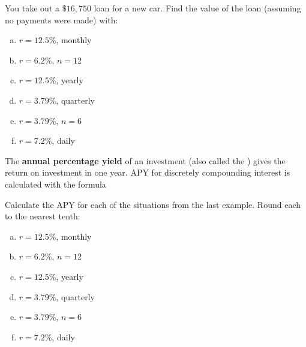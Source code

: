 \documentclass[notes]{subfiles}
\begin{document}
		\begin{ex}
			You take out a $\$16,750$ loan for a new car.  Find the value of the loan (assuming no payments were made) with:
			\begin{enumerate}[(a)]
				\item $r = 12.5\%$, monthly
				\item $r = 6.2\%$, $n = 12$
				\item $r = 12.5\%$, yearly
				\item $r = 3.79\%$, quarterly
					\newpage
					
				\item $r = 3.79\%$, $n = 6$
				\item $r = 7.2\%$, daily
			\end{enumerate}
		\end{ex}

		\begin{defn}
			The \textbf{annual percentage yield} of an investment (also called the ) gives the return on investment in one year.  APY for discretely compounding interest is calculated with the formula
				\fitb{\[APY_{\text{D}} = \left[\lrpar{1+\dfrac{r}{n}}^{n}-1\right]\cdot 100\%\]}{\vspace{1in}}
		\end{defn}

		\begin{ex}
			Calculate the APY for each of the situations from the last example.  Round each to the nearest tenth:
			\begin{enumerate}[(a)]
				\item $r = 12.5\%$, monthly
					\vs{1}

				\item $r = 6.2\%$, $n = 12$
					\vs{1}

				\item $r = 12.5\%$, yearly
					\vs{1}
					\newpage
					
				\item $r = 3.79\%$, quarterly
					\vs{1}

				\item $r = 3.79\%$, $n = 6$
					\vs{1}

				\item $r = 7.2\%$, daily
					\vs{1}

			\end{enumerate}
		\end{ex}
			
\end{document}
